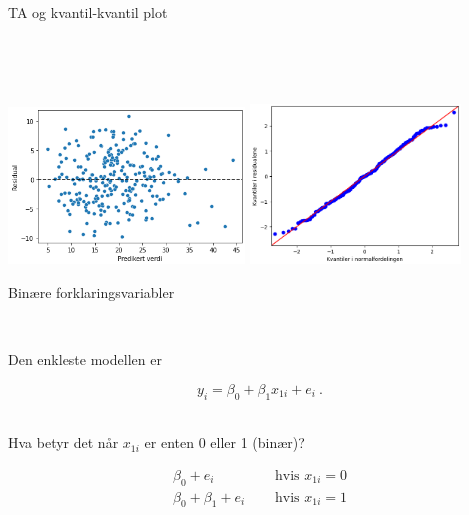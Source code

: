 \documentclass[10pt,ignorenonframetext,]{beamer}
\begin{document}
\begin{frame}

\begin{block}{TA og kvantil-kvantil plot}

\(~\)

\(~\)

\includegraphics[width=0.47\textwidth,height=\textheight]{ta2.png}
\includegraphics[width=0.42\textwidth,height=\textheight]{qq2.png}

\end{block}

\end{frame}

\begin{frame}

\begin{block}{Binære forklaringsvariabler}

\(~\)

Den enkleste modellen er

\[y_i = \beta_0 + \beta_1 x_{1i} + e_i \ .\] \(~\)

Hva betyr det når \(x_{1i}\) er enten 0 eller 1 (binær)?

\[
\begin{array}{ll}
 \beta_0  + e_i \quad &\text{ hvis  } x_{1i}=0 \\
 \beta_0 + \beta_1 + e_i \quad &\text{ hvis  } x_{1i} =1\\
\end{array}
\]

\end{block}

\end{frame}
\end{document}
